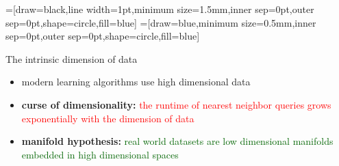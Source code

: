 \newcommand\mybox[2][]{\tikz[overlay]\node[fill=lightyellow,inner sep=2pt, anchor=text, rectangle, rounded corners=1mm,draw=black,#1] {#2};\phantom{#2}}

=[draw=black,line width=1pt,minimum size=1.5mm,inner sep=0pt,outer sep=0pt,shape=circle,fill=blue]
=[draw=blue,minimum size=0.5mm,inner sep=0pt,outer sep=0pt,shape=circle,fill=blue]

\begin{frame}{The intrinsic dimension of data}

\begin{itemize}
\item
modern learning algorithms use high dimensional data

\item
\textbf{curse of dimensionality:}
\textcolor{red}{
the runtime of nearest neighbor queries grows exponentially with the dimension of data
}

\pause
\item
\textbf{manifold hypothesis:}
\textcolor{darkgreen}{
real world datasets are low dimensional manifolds embedded in high dimensional spaces
}
\end{itemize}


\pause
\begin{center}
\end{center}

\end{frame}


